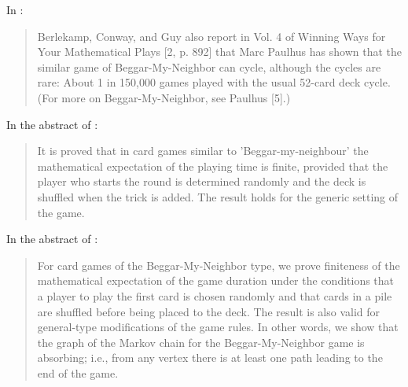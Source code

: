 \documentclass[a4paper,12pt]{article}
\begin{document}
In \cite{spivey2010cycles}:
\begin{quotation}
Berlekamp, Conway, and Guy also report in Vol. 4 of Winning Ways for Your 
Mathematical Plays [2, p. 892] that Marc Paulhus has shown that the similar game 
of Beggar-My-Neighbor can cycle, although the cycles are rare: About 1 in 
150,000 games played with the usual 52-card deck cycle. (For more on 
Beggar-My-Neighbor, see Paulhus [5].)
\end{quotation}

In the abstract of \cite{russians_arxiv}:
\begin{quotation}
It is proved that in card games similar to 'Beggar-my-neighbour' the 
mathematical expectation of the playing time is finite, provided that the player 
who starts the round is determined randomly and the deck is shuffled when the 
trick is added. The result holds for the generic setting of the game.
\end{quotation}

In the abstract of \cite{russians_2013}:
\begin{quotation}
For card games of the Beggar-My-Neighbor type, we prove finiteness of the 
mathematical expectation of the game duration under the conditions that a player 
to play the first card is chosen randomly and that cards in a pile are shuffled 
before being placed to the deck. The result is also valid for general-type 
modifications of the game rules. In other words, we show that the graph of the 
Markov chain for the Beggar-My-Neighbor game is absorbing; i.e., from any vertex 
there is at least one path leading to the end of the game.
\end{quotation}

\printbibliography
\end{document}
